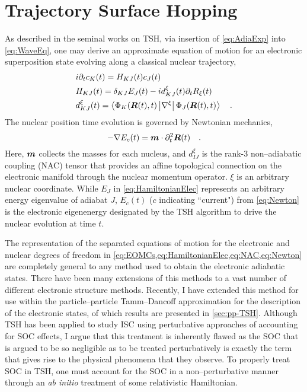 \section{Trajectory Surface Hopping}
\label{sec:TSH}

As described in the seminal works on TSH\cite{Tully98_407, Tully90_1061}, via
insertion of \cref{eq:AdiaExp} into \cref{eq:WaveEq}, one may derive an
approximate equation of motion for an electronic superposition state evolving
along a classical nuclear trajectory,
\begin{align}
  &i  \partial_t c_K(t) = H_{KJ}(t) c_J(t) \label{eq:EOMCs} \\
  &H_{KJ}(t) = \delta_{KJ}E_J(t) - i d_{KJ}^\xi (t) \partial_t R_{\xi}(t) \label{eq:HamiltonianElec} \\
  &d_{KJ}^\xi (t) = \left\langle \Phi_K(\boldsymbol{R}(t),t) \left\vert \nabla^\xi \right\vert \Phi_J(\boldsymbol{R}(t),t) \right\rangle \label{eq:NAC}
  \quad .
\end{align}
The nuclear position time evolution is governed by Newtonian mechanics,
\begin{equation}
  -\nabla E_c(t) = \boldsymbol{m}\cdot \partial_t^2\boldsymbol{R}(t) \label{eq:Newton}
  \quad.
\end{equation}
Here, $\boldsymbol{m}$ collects the masses for each nucleus, and $d_{IJ}^\xi$ is the
rank-3 non--adiabatic coupling (NAC) tensor that provides an affine topological
connection on the electronic manifold through the nuclear momentum operator.
$\xi$ is an arbitrary nuclear coordinate.  While $E_J$ in
\cref{eq:HamiltonianElec} represents an arbitrary energy eigenvalue of adiabat
$J$, $E_c(t)$ ($c$ indicating ``current") from \cref{eq:Newton} is the
electronic eigenenergy designated by the TSH algorithm to drive the nuclear
evolution at time $t$.  


The representation of the separated equations of motion for the electronic and
nuclear degrees of freedom in
\cref{eq:EOMCs,eq:HamiltonianElec,eq:NAC,eq:Newton} are completely general to
any method used to obtain the electronic adiabatic states. There have been many
extensions of this methods to a vast number of different electronic structure
methods. Recently, I have extended this method for use within the
particle--particle Tamm--Dancoff approximation for the description of the
electronic states\cite{DBWY16_Submitted1}, of which results are presented in
\cref{sec:pp-TSH}. Although TSH has been applied to study ISC using perturbative
approaches of accounting for SOC effects, I argue that this treatment is
inherently flawed as the SOC that is argued to be so negligible as to be
treated perturbatively is exactly the term that gives rise to the physical
phenomena that they observe. To properly treat SOC in TSH, one must account for
the SOC in a non--perturbative manner through an \emph{ab initio} treatment of
some relativistic Hamiltonian.


